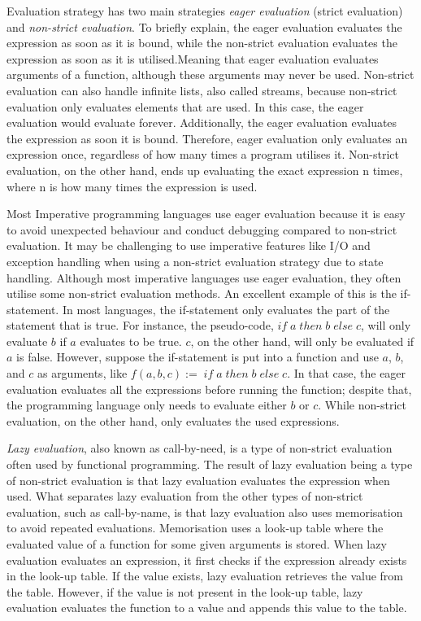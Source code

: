 \para
Evaluation strategy has two main strategies \emph{eager evaluation} (strict evaluation) and \emph{non-strict evaluation}. To briefly explain, the eager evaluation evaluates the expression as soon as it is bound, while the non-strict evaluation evaluates the expression as soon as it is utilised.Meaning that eager evaluation evaluates arguments of a function, although these arguments may never be used. Non-strict evaluation can also handle infinite lists, also called streams, because non-strict evaluation only evaluates elements that are used. In this case, the eager evaluation would evaluate forever. Additionally, the eager evaluation evaluates the expression as soon it is bound. Therefore, eager evaluation only evaluates an expression once, regardless of how many times a program utilises it. Non-strict evaluation, on the other hand, ends up evaluating the exact expression n times, where n is how many times the expression is used.

\para
Most Imperative programming languages use eager evaluation because it is easy to avoid unexpected behaviour and conduct debugging compared to non-strict evaluation. It may be challenging to use imperative features like I/O and exception handling when using a non-strict evaluation strategy due to state handling. Although most imperative languages use eager evaluation, they often utilise some non-strict evaluation methods. An excellent example of this is the if-statement. In most languages, the if-statement only evaluates the part of the statement that is true. For instance, the pseudo-code, $if\; a\; then\; b\; else\; c$, will only evaluate $b$ if $a$ evaluates to be true. $c$, on the other hand, will only be evaluated if $a$ is false. However, suppose the if-statement is put into a function and use $a$, $b$, and $c$ as arguments, like $f(a, b,c):= \; if\; a\; then\; b\; else\; c$. In that case, the eager evaluation evaluates all the expressions before running the function; despite that, the programming language only needs to evaluate either $b$ or $c$. While non-strict evaluation, on the other hand, only evaluates the used expressions.

\para
\emph{Lazy evaluation}, also known as call-by-need, is a type of non-strict evaluation often used by functional programming. The result of lazy evaluation being a type of non-strict evaluation is that lazy evaluation evaluates the expression when used. What separates lazy evaluation from the other types of non-strict evaluation, such as call-by-name, is that lazy evaluation also uses memorisation to avoid repeated evaluations.  Memorisation uses a look-up table where the evaluated value of a function for some given arguments is stored.  When lazy evaluation evaluates an expression, it first checks if the expression already exists in the look-up table. If the value exists, lazy evaluation retrieves the value from the table. However, if the value is not present in the look-up table, lazy evaluation evaluates the function to a value and appends this value to the table. 

